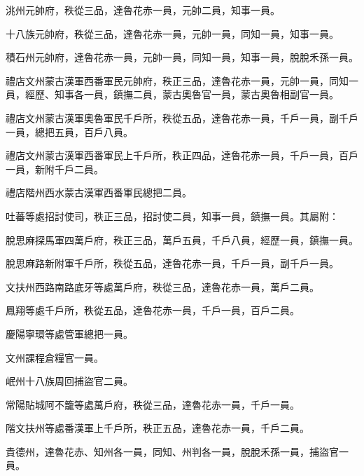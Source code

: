 \begin{pinyinscope}
 洮州元帥府，秩從三品，達魯花赤一員，元帥二員，知事一員。



 十八族元帥府，秩從三品，達魯花赤一員，元帥一員，同知一員，知事一員。



 積石州元帥府，達魯花赤一員，元帥一員，同知一員，知事一員，脫脫禾孫一員。



 禮店文州蒙古漢軍西番軍民元帥府，秩正三品，達魯花赤一員，元帥一員，同知一員，經歷、知事各一員，鎮撫二員，蒙古奧魯官一員，蒙古奧魯相副官一員。



 禮店文州蒙古漢軍奧魯軍民千戶所，秩從五品，達魯花赤一員，千戶一員，副千戶一員，總把五員，百戶八員。



 禮店文州蒙古漢軍西番軍民上千戶所，秩正四品，達魯花赤一員，千戶一員，百戶一員，新附千戶二員。



 禮店階州西水蒙古漢軍西番軍民總把二員。



 吐蕃等處招討使司，秩正三品，招討使二員，知事一員，鎮撫一員。其屬附：



 脫思麻探馬軍四萬戶府，秩正三品，萬戶五員，千戶八員，經歷一員，鎮撫一員。



 脫思麻路新附軍千戶所，秩從五品，達魯花赤一員，千戶一員，副千戶一員。



 文扶州西路南路底牙等處萬戶府，秩從三品，達魯花赤一員，萬戶二員。



 鳳翔等處千戶所，秩從五品，達魯花赤一員，千戶一員，百戶二員。



 慶陽寧環等處管軍總把一員。



 文州課程倉糧官一員。



 岷州十八族周回捕盜官二員。



 常陽貼城阿不籠等處萬戶府，秩從三品，達魯花赤一員，千戶一員。



 階文扶州等處番漢軍上千戶所，秩正五品，達魯花赤一員，千戶二員。



 貴德州，達魯花赤、知州各一員，同知、州判各一員，脫脫禾孫一員，捕盜官一員。




\end{pinyinscope}
